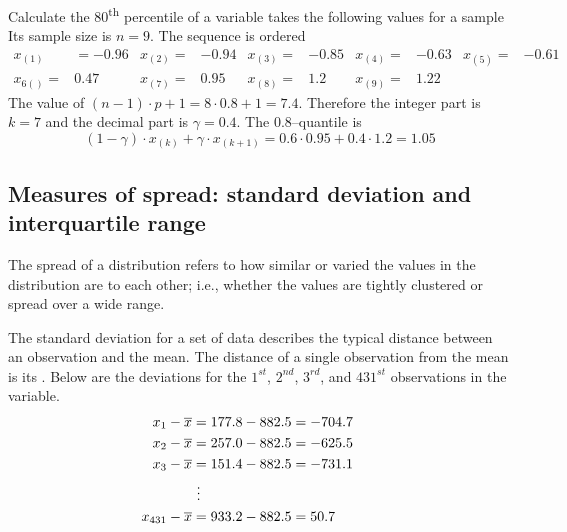 \begin{examplewrap}
  \begin{nexample}{
 Calculate the 80\textsuperscript{th} percentile of  a variable takes the following values for a sample 
%
}
Its sample size is $n=9$. 
The sequence is ordered 
\begin{align*}
  x_{(1)}& =-0.96  &x_{(2)} = &  -0.94  &x_{(3)} = &  -0.85  &x_{(4)}
  = &  -0.63  &x_{(5)} = &  -0.61  \\ x_{6()} = &  0.47  &x_{(7)} = &
  0.95  &x_{(8)} = &  1.2  &x_{(9)} = &  1.22
\end{align*}
The value of $(n-1) \cdot p +1= 8\cdot 0.8+1=7.4$. Therefore the
integer part is $k=7$ and the decimal part is $\gamma= 0.4$.  
The $0.8$--quantile is 
$$ (1-\gamma)\cdot x_{(k)} +\gamma \cdot x_{(k+1)}=0.6\cdot
0.95+0.4\cdot 1.2=1.05$$
\end{nexample}
\end{examplewrap}

\subsection{Measures of spread: standard deviation and interquartile range}
\label{measuresOfSpread}

The spread of a distribution refers to how similar or varied the values in the distribution are to each other; i.e., whether the values are tightly clustered or spread over a wide range.  

The standard deviation for a set of data describes the typical distance between an observation and the mean. The distance of a single observation from the mean is its . Below are the deviations for the $1^{st}$, $2^{nd}$, $3^{rd}$, and $431^{st}$ observations in the  variable.
\begin{align*}
x_1-\overline{x} &= 177.8 - 882.5 = -704.7 \hspace{5mm}\text{ } \\
x_2-\overline{x} &= 257.0 - 882.5 = -625.5 \\
x_3-\overline{x} &= 151.4 - 882.5 = -731.1 \\
&\ \vdots \\
x_{431}-\overline{x} &= 933.2 - 882.5 = 50.7
\end{align*}

